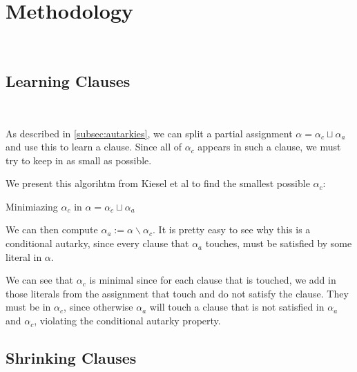 \section{Methodology}~\label{sec:method}

\subsection{Learning Clauses}~\label{subsec:learning}

As described in \autoref{subsec:autarkies}, we can split a partial assignment $\alpha = \alpha_c \sqcup \alpha_a$ and use this to learn a \pr clause. Since all of $\alpha_c$ appears in such a clause, we must try to keep in as small as possible.

We present this algorihtm from Kiesel et al \cite{conditionalautarkies} to find the smallest possible $\alpha_c$:


\begin{algorithm}
    \caption{Minimiazing $\alpha_c$ in $\alpha = \alpha_c \sqcup \alpha_a$}\label{alg:leastcond}
    \SetAlgoNoLine

\end{algorithm}

We can then compute $\alpha_a := \alpha \backslash \alpha_c$. It is pretty easy to see why this is a conditional autarky, since every clause that $\alpha_a$ touches, must be satisfied by some literal in $\alpha$.

We can see that $\alpha_c$ is minimal since for each clause that is touched, we add in those literals from the assignment that touch and do not satisfy the clause. They must be in $\alpha_c$, since otherwise $\alpha_a$ will touch a clause that is not satisfied in $\alpha_a$ and $\alpha_c$, violating the conditional autarky property.

\subsection{Shrinking Clauses}~\label{subsec:shrinking}

